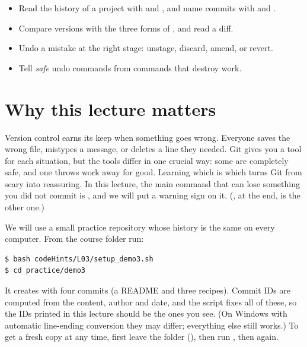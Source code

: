 


\begin{goals}
\begin{itemize}
  \item Read the history of a project with  and , and name commits with  and .
  \item Compare versions with the three forms of , and read a diff.
  \item Undo a mistake at the right stage: unstage, discard, amend, or revert.
  \item Tell \emph{safe} undo commands from commands that destroy work.
\end{itemize}
\end{goals}

\section{Why this lecture matters}

Version control earns its keep when something goes wrong. Everyone saves the wrong file, mistypes a message, or deletes a line they needed. Git gives you a tool for each situation, but the tools differ in one crucial way: some are completely safe, and one throws work away for good. Learning which is which turns Git from scary into reassuring. In this lecture, the main command that can lose something you did not commit is , and we will put a warning sign on it. (, at the end, is the other one.)

We will use a small practice repository whose history is the same on every computer. From the course folder run:

\begin{lstlisting}
$ bash codeHints/L03/setup_demo3.sh
$ cd practice/demo3
\end{lstlisting}

It creates  with four commits (a README and three recipes). Commit IDs are computed from the content, author and date, and the script fixes all of these, so the IDs printed in this lecture should be the ones you see. (On Windows with automatic line-ending conversion they may differ; everything else still works.) To get a fresh copy at any time, first leave the folder (), then run , then  again.

